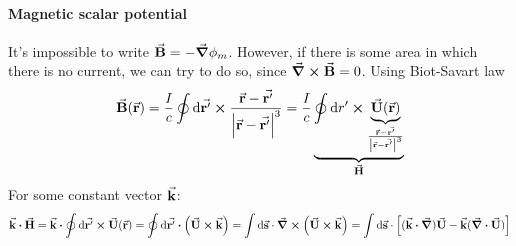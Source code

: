 \paragraph{Magnetic scalar potential}
It's impossible to write $\va{B} = -\grad{\phi_m}$. However, if there is some area in which there is no current, we can try to do so, since $\curl{\va{B}} = 0$.
Using Biot-Savart law
$$\va{B}(\va{r})= \frac{I}{c} \oint \dd{\va{r'}} \cross \frac{\va{r}-\va{r'}}{\abs{\va{r}-\va{r'}}^3} = \frac{I}{c} \underbrace{\oint \dd{r'} \cross \underbrace{\va{U}(\va{r})}_{\frac{\va{r}-\va{r'}}{\abs{\va{r}-\va{r'}}^3}}}_{\va{H}}$$
For some constant vector $\va{k}$:
$$\va{k}\vdot \va{H} = \va{k} \vdot \oint \dd{\va{r'}} \cross \va{U}(\va{r}) = \oint \dd{\va{r'}} \vdot \qty(\va{U} \cross \va{k}  ) = \int \dd{\va{s}} \cdot \curl(\va{U} \cross \va{k}) = \int \dd{\va{s}} \cdot \qty[ (\va{k} \vdot \grad)\va{U} - \va{k} (\div{\va{U}})]$$